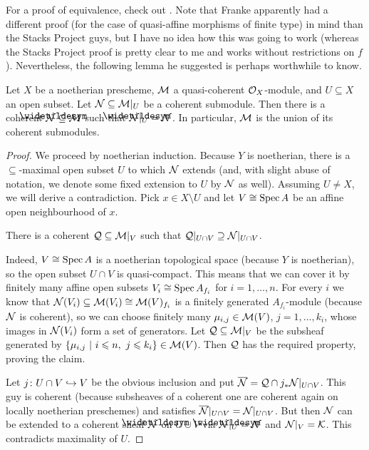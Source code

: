 \documentclass[a4paper,parskip=half,numbers=enddot, DIV=12]{scrreprt}
\renewcommand{\leq}{\leqslant}
\begin{document}
For a proof of equivalence, check out \cite[]{stacks-project}. Note that Franke apparently had a different proof (for the case of quasi-affine morphisms of finite type) in mind than the Stacks Project guys, but I have no idea how this was going to work (whereas the Stacks Project proof is pretty clear to me and works without restrictions on $f$). Nevertheless, the following lemma he suggested is perhaps worthwhile to know.
\begin{lem}
	Let $X$ be a noetherian prescheme, $\mathcal{M}$ a quasi-coherent $\mathcal{O}_X$-module, and $U\subseteq X$ an open subset. Let $\mathcal{N}\subseteq \mathcal{M}|_U$ be a coherent submodule. Then there is a coherent $\snake{\Nn}\subseteq \Mm$ such that $\snake{\Nn}|_U=\Nn$. In particular, $\mathcal{M}$ is the union of its coherent submodules.
\end{lem}
\begin{proof}
	We proceed by noetherian induction. Because $Y$ is noetherian, there is a $\subseteq$-maximal open subset $U$ to which $\mathcal{N}$ extends (and, with slight abuse of notation, we denote some fixed extension to $U$ by $\mathcal{N}$ as well). Assuming $U\neq X$, we will derive a contradiction. Pick $x\in X\setminus U$ and let $V\cong \operatorname{Spec} A$ be an affine open neighbourhood of $x$. 
	\begin{claim*}
		There is a coherent $\mathcal{Q}\subseteq \mathcal{M}|_V$ such that $\mathcal{Q}|_{U\cap V}\supseteq \mathcal{N}|_{U\cap V}$.
	\end{claim*}
	Indeed, $V\cong \operatorname{Spec} A$ is a noetherian topological space (because $Y$ is noetherian), so the open subset $U\cap V$ is quasi-compact. This means that we can cover it by finitely many affine open subsets $V_i\cong \operatorname{Spec} A_{f_i}$ for $i=1,\ldots,n$. For every $i$ we know that $\mathcal{N}(V_i)\subseteq \mathcal{M}(V_i)\cong \mathcal{M}(V)_{f_i}$ is a finitely generated $A_{f_i}$-module (because $\mathcal{N}$ is coherent), so we can choose finitely many $\mu_{i,j}\in \mathcal{M}(V)$, $j=1,\ldots,k_i$, whose images in $\mathcal{N}(V_i)$ form a set of generators. Let $\mathcal{Q}\subseteq \mathcal{M}|_V$ be the subsheaf generated by $\left\{\mu_{i,j}\st i\leq n,\ j\leq k_i\right\}\in\Mm(V)$. Then $\mathcal{Q}$ has the required property, proving the claim.
	
	Let $j\colon U\cap V\monomorphism V$ be the obvious inclusion and put $\overline{\mathcal{N}}=\mathcal{Q}\cap j_*\mathcal{N}|_{U\cap V}$. This guy is coherent (because subsheaves of a coherent one are coherent again on locally noetherian preschemes) and satisfies $\overline{\mathcal{N}}|_{U\cap V}=\mathcal{N}|_{U\cap V}$. But then $\mathcal{N}$ can be extended to a coherent sheaf $\snake{\Nn}$ on $U\cup V$ via $\snake{\Nn}|_U=\Nn$ and $\mathcal{N}|_V=\mathcal{K}$. This contradicts maximality of $U$.
\end{proof}
\end{document}
